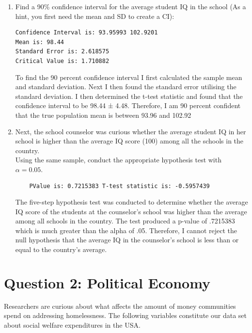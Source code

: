 \documentclass[12pt,letterpaper]{article}
\begin{document}
\begin{enumerate}
	\item Find a 90\% confidence interval for the average student IQ in the school (As a hint, you first need the mean and SD to create a CI):\\
	  
\begin{verbatim}
Confidence Interval is: 93.95993 102.9201
Mean is: 98.44 
Standard Error is: 2.618575
Critical Value is: 1.710882
 	\end{verbatim}
	\noindent
	To find the 90 percent confidence interval I first calculated the sample mean and standard deviation.  Next I then found the standard error utilising the standard deviation. I then determined  the t-test statistic and found that the confidence interval to be 98.44 ± 4.48. Therefore, I am 90 percent confident that the true population mean is between 93.96 and 102.92
	
	
	\item Next, the school counselor was curious  whether  the average student IQ in her school is higher than the average IQ score (100) among all the schools in the country.\\ 
	
	\noindent Using the same sample, conduct the appropriate hypothesis test with $\alpha=0.05$.
	
		  
		
	\begin{verbatim}
	PValue is: 0.7215383 T-test statistic is: -0.5957439
	\end{verbatim}
	\noindent 
	
	The five-step hypothesis test was conducted to determine whether the average IQ score of the students at the counselor's school was higher than the average among all schools in the country. The test produced a p-value  of .7215383 which is much greater than the alpha of .05. Therefore, I cannot reject the null hypothesis that the average IQ in the counselor's school is less than or equal to the country's average.
\end{enumerate}
\newpage

	\section*{Question 2: Political Economy}

\noindent Researchers are curious about what affects the amount of money communities spend on addressing homelessness. The following variables constitute our data set about social welfare expenditures in the USA. \\
\vspace{.5cm}
\end{document}
